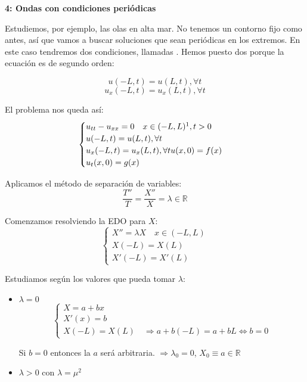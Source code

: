 
		\begin{example}{\bf 4: Ondas con condiciones periódicas}\label{ec:ondas}

			Estudiemos, por ejemplo, las olas en alta mar. No tenemos un contorno fijo como antes, así que vamos a buscar soluciones que sean periódicas en los extremos. En este caso tendremos dos condiciones, llamadas . Hemos puesto dos porque la ecuación es de segundo orden:

			\[u(-L,t) = u(L,t), \forall t\]
			\[u_x(-L,t) = u_x(L,t), \forall t\]

			El problema nos queda así:
			\[  \begin{cases}
				u_{tt} - u_{xx} = 0 \quad x  \in (-L,L)\footnotemark, t>0\\
				u(-L,t) = u(L,t), \forall t\\
				u_x(-L,t) = u_x(L,t), \forall t
				u(x,0) = f(x) \\
				u_t(x,0) = g(x)
				\end{cases}
			\]

			Aplicamos el método de separación de variables:
			\[ \frac{T''}{T} = \frac{X''}{X} = \lambda \in \mathbb{R}\]

			Comenzamos resolviendo la EDO para $X$:
			\[\left\{\begin{array}{l}
				X'' = \lambda X \quad x \in (-L,L) \\
				X(-L) = X(L) \\
				X'(-L) = X'(L)
			\end{array}
			\right. \]

			Estudiamos según los valores que pueda tomar $\lambda$:
			\begin{itemize}
				\item $\lambda = 0$
					\[\left\{\begin{array}{l}
						X = a+bx \\
						X'(x) = b \\
						X(-L) = X(L) \quad \Rightarrow a + b(-L) = a + bL \Leftrightarrow b = 0
					\end{array}
					\right. \]

					Si $b = 0$ entonces la $a$ será arbitraria. $\Rightarrow \lambda_0 = 0$, $ X_0 \equiv a \in \mathbb{R}$


				\item $\lambda > 0$ con $\lambda = \mu^2$


\end{itemize}
\end{example}
